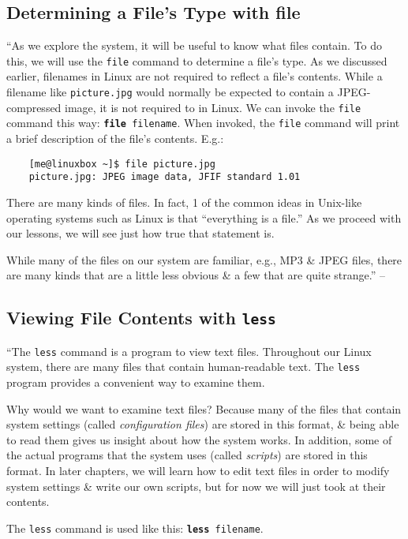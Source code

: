 \documentclass[oneside]{book}
\numberwithin{equation}{section}
\begin{document}
\subsection{Determining a File's Type with file}
``As we explore the system, it will be useful to know what files contain. To do this, we will use the \texttt{file} command to determine a file's type. As we discussed earlier, filenames in Linux are not required to reflect a file's contents. While a filename like \texttt{picture.jpg} would normally be expected to contain a JPEG-compressed image, it is not required to in Linux. We can invoke the \texttt{file} command this way: \texttt{\textbf{file} filename}. When invoked, the \texttt{file} command will print a brief description of the file's contents. E.g.:
\begin{verbatim}
	[me@linuxbox ~]$ file picture.jpg
	picture.jpg: JPEG image data, JFIF standard 1.01
\end{verbatim}
There are many kinds of files. In fact, 1 of the common ideas in Unix-like operating systems such as Linux is that ``everything is a file.'' As we proceed with our lessons, we will see just how true that statement is.

While many of the files on our system are familiar, e.g., MP3 \& JPEG files, there are many kinds that are a little less obvious \& a few that are quite strange.'' -- \cite[pp. 54--55]{Shotts2019}

\subsection{Viewing File Contents with \texttt{less}}
``The \texttt{less} command is a program to view text files. Throughout our Linux system, there are many files that contain human-readable text. The \texttt{less} program provides a convenient way to examine them.

Why would we want to examine text files? Because many of the files that contain system settings (called \textit{configuration files}) are stored in this format, \& being able to read them gives us insight about how the system works. In addition, some of the actual programs that the system uses (called \textit{scripts}) are stored in this format. In later chapters, we will learn how to edit text files in order to modify system settings \& write our own scripts, but for now we will just took at their contents.

The \texttt{less} command is used like this: \texttt{\textbf{less} filename}.
\end{document}
